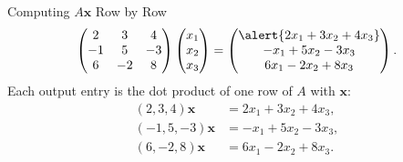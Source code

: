 \begin{frame}{Computing $A\mathbf{x}$ Row by Row}
  \[
    \begin{pmatrix}2&3&4\\-1&5&-3\\6&-2&8\end{pmatrix}
    \begin{pmatrix}x_1\\x_2\\x_3\end{pmatrix}
    =\begin{pmatrix}
       \alert{2x_1+3x_2+4x_3}\\
       -x_1+5x_2-3x_3\\
       6x_1-2x_2+8x_3
     \end{pmatrix}.
  \]
  Each output entry is the dot product of one row of $A$ with $\mathbf{x}$:
  \[
    \begin{aligned}
      (2,3,4)\mathbf{x}&=2x_1+3x_2+4x_3,\\
      (-1,5,-3)\mathbf{x}&=-x_1+5x_2-3x_3,\\
      (6,-2,8)\mathbf{x}&=6x_1-2x_2+8x_3.
    \end{aligned}
  \]
\end{frame}

